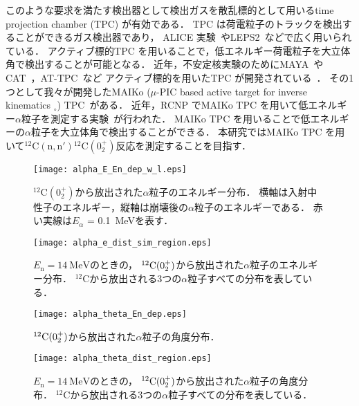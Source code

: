 \documentclass[../master]{subfiles}
\begin{document}
このような要求を満たす検出器として検出ガスを散乱標的として用いるtime projection chamber (TPC) が有効である．
TPC は荷電粒子のトラックを検出することができるガス検出器であり，
ALICE 実験~\cite{alice-tpc}やLEPS2~\cite{kobayakawa_thesis}などで広く用いられている．
アクティブ標的TPC を用いることで，低エネルギー荷電粒子を大立体角で検出することが可能となる．
近年，不安定核実験のためにMAYA~\cite{maya}やCAT~\cite{cat-tpc}，AT-TPC~\cite{at-tpc}など
アクティブ標的を用いたTPC が開発されている~\cite{active-tpc}．
その1つとして我々が開発したMAIKo ($\mu$-PIC based active target for inverse kinematics $_{\circ}$)
 TPC~\cite{maiko, mupic}がある．
近年，RCNP でMAIKo TPC を用いて低エネルギー$\alpha$粒子を測定する実験~\cite{Furuno2019}が行われた．
MAIKo TPC を用いることで低エネルギーの$\alpha$粒子を大立体角で検出することができる．
本研究ではMAIKo TPC を用いて${}^{12}\mathrm{C}(\mathrm{n},\mathrm{n}'){}^{12}\mathrm{C} (0_2^+)$反応を測定することを目指す．
\begin{figure}
  \centering
  \texttt{[image: alpha\_E\_En\_dep\_w\_l.eps]}
  \caption{${}^{12}\mathrm{C} (0_2^+)$から放出された$\alpha$粒子のエネルギー分布．
    横軸は入射中性子のエネルギー，縦軸は崩壊後の$\alpha$粒子のエネルギーである．
    赤い実線は$E_{\alpha}$ = \SI{0.1}{\mega\electronvolt}を表す．}
  \label{fig::alpha_E_En_dep_w_l}
\end{figure}
\begin{figure}
  \centering
  \texttt{[image: alpha\_e\_dist\_sim\_region.eps]}
  \caption[${}^{12}{\rm C} (0_2^+)$から放出された$\alpha$粒子のエネルギー分布．]
          {$E_{\mathrm{n}}=\SI{14}{\mega\electronvolt}$のときの，
            ${}^{12}{\rm C} (0_2^+)$から放出された$\alpha$粒子のエネルギー分布．
            ${}^{12}\mathrm{C}$から放出される3つの$\alpha$粒子すべての分布を表している．}
          \label{fig::alpha_E_dist}
\end{figure}
\begin{figure}
  \centering
  \texttt{[image: alpha\_theta\_En\_dep.eps]}
  \caption{${}^{12}{\rm C} (0_2^+)$から放出された$\alpha$粒子の角度分布．}
  \label{fig::alpha_theta_En_dep}
\end{figure}
\begin{figure}
  \centering
  \texttt{[image: alpha\_theta\_dist\_region.eps]}
  \caption[${}^{12}{\rm C} (0_2^+)$から放出された$\alpha$粒子の角度分布．]
          {$E_{\mathrm{n}}=\SI{14}{\mega\electronvolt}$のときの，
            ${}^{12}{\rm C} (0_2^+)$から放出された$\alpha$粒子の角度分布．
            ${}^{12}\mathrm{C}$から放出される3つの$\alpha$粒子すべての分布を表している．
          }
  \label{fig::alpha_theta_dist}
\end{figure}
\end{document}
